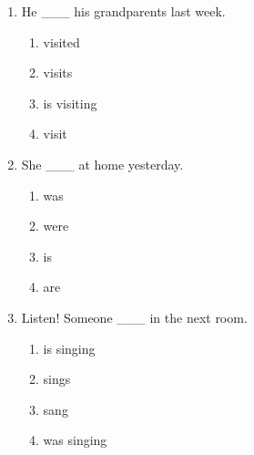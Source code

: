 \documentclass[11pt,a4paper]{ctexart}
\begin{document}
\begin{enumerate}[leftmargin=*,itemsep=4pt]
\begin{enumerate}[label=\Alph*.,leftmargin=2em,itemsep=1pt,topsep=2pt]
\end{enumerate}
\item He \_\_\_ his grandparents last week.
\begin{enumerate}[label=\Alph*.,leftmargin=2em,itemsep=1pt,topsep=2pt]
\item visited
\item visits
\item is visiting
\item visit
\end{enumerate}
\item She \_\_\_ at home yesterday.
\begin{enumerate}[label=\Alph*.,leftmargin=2em,itemsep=1pt,topsep=2pt]
\item was
\item were
\item is
\item are
\end{enumerate}
\item Listen! Someone \_\_\_ in the next room.
\begin{enumerate}[label=\Alph*.,leftmargin=2em,itemsep=1pt,topsep=2pt]
\item is singing
\item sings
\item sang
\item was singing
\end{enumerate}
\end{enumerate}

\newpage
\end{document}
